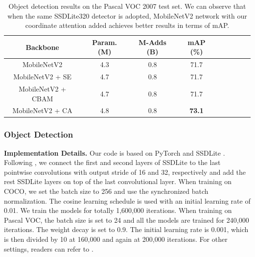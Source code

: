 \documentclass[final]{cvpr}
\newcommand{\myPara}[1]{\vspace{.05in}\noindent\textbf{#1.}}
\begin{document}
\begin{table}[t]
    \centering
    \small
    \setlength\tabcolsep{1.2mm}
    \renewcommand{\arraystretch}{1.1}
    \caption{Object detection results on the Pascal VOC 2007 test set. 
    We can observe that when the same SSDLite320 detector is adopted, MobileNetV2 network
    with our coordinate attention added
    achieves better results in terms of mAP.}
    \begin{tabular}{ccccccccc} \toprule[1pt] %
        Backbone &  Param. (M) & M-Adds (B) & mAP (\%) \\ \midrule[1pt]
        MobileNetV2 \cite{sandler2018mobilenetv2}  & 4.3 & 0.8  & 71.7 \\
        MobileNetV2 + SE  & 4.7 & 0.8  & 71.7 \\
        MobileNetV2 + CBAM  & 4.7 & 0.8  & 71.7 \\
        MobileNetV2 + CA  & 4.8 & 0.8  & \textbf{73.1} \\
        \bottomrule[1.0pt]
        \end{tabular}
        \label{tab:voc_detection}
\end{table}

\subsubsection{Object Detection}


\myPara{Implementation Details}
Our code is based on PyTorch and SSDLite \cite{sandler2018mobilenetv2,liu2016ssd}.
%
Following \cite{sandler2018mobilenetv2}, we
connect the first and second layers of SSDLite 
to the last pointwise convolutions with output stride of 16 and 32, respectively
and add the rest SSDLite layers on top of the 
last convolutional layer.
%
When training on COCO, we set the batch size to 256 and use the synchronized batch normalization.
%
The cosine learning schedule is used with an initial learning rate of 0.01.
%
We train the models for totally 1,600,000 iterations.
%
When training on Pascal VOC, the batch size is
set to 24 and all the models
are trained for 240,000 iterations.
%
The weight decay is set to 0.9.
%
The initial learning rate is 0.001, 
which is then divided by 10 at 160,000 and again at 200,000 iterations.
%
For other settings, readers can refer to
\cite{sandler2018mobilenetv2,liu2016ssd}.
\end{document}
